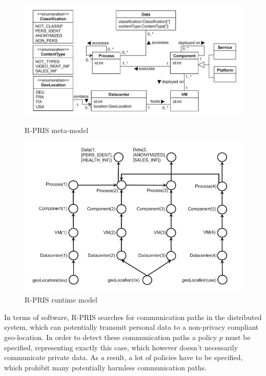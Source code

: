 \begin{figure}[h]
	\centering
	\begin{minipage}[b]{0.48\textwidth}		\includegraphics[width=\textwidth]{pictures/rpris_metamodel.jpg}
		\caption{R-PRIS meta-model}
		\label{fig:rpris_metamodel}
	\end{minipage}
	\begin{minipage}[b]{0.48\textwidth}
		\includegraphics[width=\textwidth]{pictures/rpris_model.jpg}
		\caption{R-PRIS runtime model}
		\label{fig:rpris_model}
	\end{minipage}
\end{figure}

In terms of software, R-PRIS searches for communication paths in the distributed system, which can potentially transmit personal data to a non-privacy compliant geo-location. In order to detect these communication paths a policy $p$ must be specified, representing exactly this case, which however doesn't necessarily communicate private data. As a result, a lot of policies have to be specified, which prohibit many potentially harmless communication paths.

